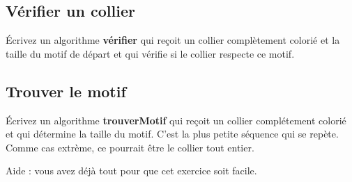 		\subsection*{Vérifier un collier}
		
			Écrivez un algorithme \textbf{vérifier}
			qui reçoit un collier complètement colorié
			et la taille du motif de départ et qui vérifie
			si le collier respecte ce motif.
		
		\subsection*{Trouver le motif}
		
			Écrivez un algorithme \textbf{trouverMotif}
			qui reçoit un collier complétement colorié
			et qui détermine la taille du motif.
			C'est la plus petite séquence qui se repète.
			Comme cas extrème, ce pourrait être le collier tout entier.
		
			Aide : vous avez déjà tout pour que cet exercice soit facile.

